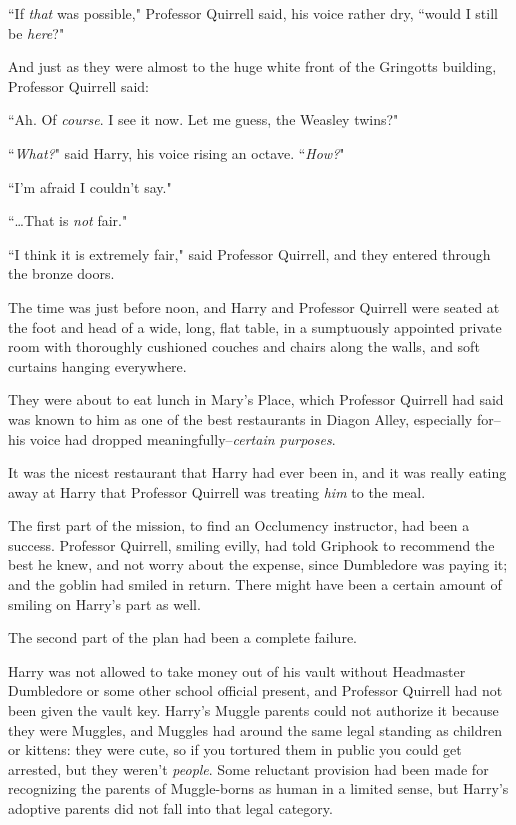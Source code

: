 ``If \emph{that} was possible," Professor Quirrell said, his voice rather dry, ``would I still be \emph{here}?"

And just as they were almost to the huge white front of the Gringotts building, Professor Quirrell said:

``Ah. Of \emph{course}. I see it now. Let me guess, the Weasley twins?"

``\emph{What?}" said Harry, his voice rising an octave.
``\emph{How?}"

``I'm afraid I couldn't say."

``{\ldots}That is \emph{not} fair."

``I think it is extremely fair," said Professor Quirrell, and they entered through the bronze doors.

\later

The time was just before noon, and Harry and Professor Quirrell were seated at the foot and head of a wide, long, flat table, in a sumptuously appointed private room with thoroughly cushioned couches and chairs along the walls, and soft curtains hanging everywhere.

They were about to eat lunch in Mary's Place, which Professor Quirrell had said was known to him as one of the best restaurants in Diagon Alley, especially for\---his voice had dropped meaningfully\---\emph{certain purposes}.

It was the nicest restaurant that Harry had ever been in, and it was really eating away at Harry that Professor Quirrell was treating \emph{him} to the meal.

The first part of the mission, to find an Occlumency instructor, had been a success. Professor Quirrell, smiling evilly, had told Griphook to recommend the best he knew, and not worry about the expense, since Dumbledore was paying it; and the goblin had smiled in return. There might have been a certain amount of smiling on Harry's part as well.

The second part of the plan had been a complete failure.

Harry was not allowed to take money out of his vault without Headmaster Dumbledore or some other school official present, and Professor Quirrell had not been given the vault key. Harry's Muggle parents could not authorize it because they were Muggles, and Muggles had around the same legal standing as children or kittens: they were cute, so if you tortured them in public you could get arrested, but they weren't \emph{people}. Some reluctant provision had been made for recognizing the parents of Muggle-borns as human in a limited sense, but Harry's adoptive parents did not fall into that legal category.

